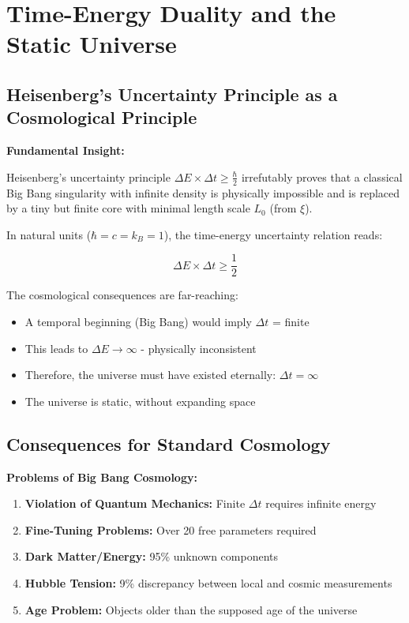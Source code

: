 	\section{Time-Energy Duality and the Static Universe}
	
	\subsection{Heisenberg's Uncertainty Principle as a Cosmological Principle}
	
	\begin{revolutionary}
		\textbf{Fundamental Insight:}
		
		Heisenberg's uncertainty principle $\Delta E \times \Delta t \geq \frac{\hbar}{2}$ irrefutably proves that a classical Big Bang singularity with infinite density is physically impossible and is replaced by a tiny but finite core with minimal length scale $L_0$ (from $\xi$).
	\end{revolutionary}
	
	In natural units ($\hbar = c = k_B = 1$), the time-energy uncertainty relation reads:
	
	\begin{equation}
		\Delta E \times \Delta t \geq \frac{1}{2}
	\end{equation}
	
	The cosmological consequences are far-reaching:
	
	\begin{itemize}
		\item A temporal beginning (Big Bang) would imply $\Delta t$ = finite
		\item This leads to $\Delta E \to \infty$ - physically inconsistent
		\item Therefore, the universe must have existed eternally: $\Delta t = \infty$
		\item The universe is static, without expanding space
	\end{itemize}
	
	\subsection{Consequences for Standard Cosmology}
	
	\begin{warning}
		\textbf{Problems of Big Bang Cosmology:}
		
		\begin{enumerate}
			\item \textbf{Violation of Quantum Mechanics:} Finite $\Delta t$ requires infinite energy
			\item \textbf{Fine-Tuning Problems:} Over 20 free parameters required
			\item \textbf{Dark Matter/Energy:} 95\% unknown components
			\item \textbf{Hubble Tension:} 9\% discrepancy between local and cosmic measurements
			\item \textbf{Age Problem:} Objects older than the supposed age of the universe
		\end{enumerate}
	\end{warning}
	
